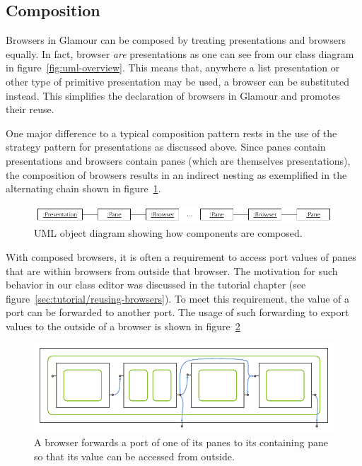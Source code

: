 \documentclass[a4paper,10pt,twoside]{book}
\begin{document}
\subsection{Composition}
\label{sec:impl/composition}

Browsers in Glamour can be composed by treating presentations and browsers equally. In fact, browser \emph{are} presentations as one can see from our class diagram in figure~\ref{fig:uml-overview}. This means that, anywhere a list presentation or other type of primitive presentation may be used, a browser can be substituted instead. This simplifies the declaration of browsers in Glamour and promotes their reuse.

One major difference to a typical composition pattern rests in the use of the strategy pattern for presentations as discussed above. Since panes contain presentations and browsers contain panes (which are themselves presentations), the composition of browsers results in an indirect nesting as exemplified in the alternating chain shown in figure~\ref{fig:uml-object-chain}.

\begin{figure}[htbp]
\centerline{\includegraphics[width=\linewidth]{uml_object_chain.pdf}}
\caption{UML object diagram showing how components are composed.}
\label{fig:uml-object-chain}
\end{figure}


With composed browsers, it is often a requirement to access port values of panes that are within browsers from outside that browser. The motivation for such behavior in our class editor was discussed in the tutorial chapter (see figure~\ref{sec:tutorial/reusing-browsers}). To meet this requirement, the value of a port can be forwarded to another port. The usage of such forwarding to export values to the outside of a browser is shown in figure~\ref{fig:abs-port_publishing}

\begin{figure}[htbp]
\centerline{\includegraphics[width=\linewidth]{portpublishing.pdf}}
\caption{A browser forwards a port of one of its panes to its containing pane so that its value can be accessed from outside.}
\label{fig:abs-port_publishing}
\end{figure}
\end{document}
